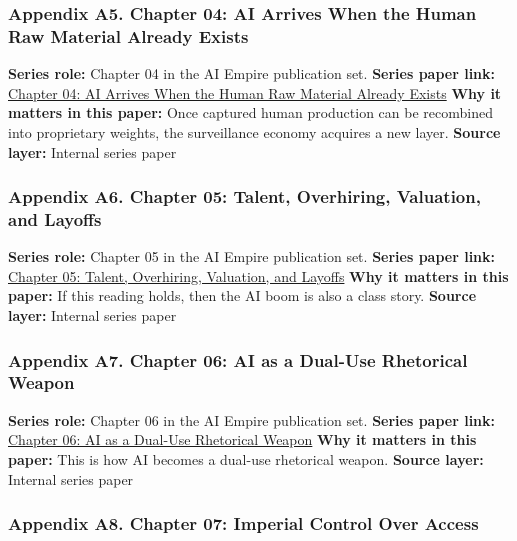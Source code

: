 \documentclass[
  american,
  11pt,
  letterpaper,
]{article}
\begin{document}
\subsubsection{Appendix A5. Chapter 04: AI Arrives When the Human Raw
Material Already
Exists}\label{appendix-a5-chapter-04-ai-arrives-when-the-human-raw-material-already-exists}

\textbf{Series role:} Chapter 04 in the AI Empire publication set.
\textbf{Series paper link:}
\href{04_data-models-weights_paper.html}{Chapter 04: AI Arrives When the
Human Raw Material Already Exists} \textbf{Why it matters in this
paper:} Once captured human production can be recombined into
proprietary weights, the surveillance economy acquires a new layer.
\textbf{Source layer:} Internal series paper

\subsubsection{Appendix A6. Chapter 05: Talent, Overhiring, Valuation,
and
Layoffs}\label{appendix-a6-chapter-05-talent-overhiring-valuation-and-layoffs}

\textbf{Series role:} Chapter 05 in the AI Empire publication set.
\textbf{Series paper link:}
\href{05_talent-overhiring-layoffs_paper.html}{Chapter 05: Talent,
Overhiring, Valuation, and Layoffs} \textbf{Why it matters in this
paper:} If this reading holds, then the AI boom is also a class story.
\textbf{Source layer:} Internal series paper

\subsubsection{Appendix A7. Chapter 06: AI as a Dual-Use Rhetorical
Weapon}\label{appendix-a7-chapter-06-ai-as-a-dual-use-rhetorical-weapon}

\textbf{Series role:} Chapter 06 in the AI Empire publication set.
\textbf{Series paper link:}
\href{06_dual-use-rhetorical-weapon_paper.html}{Chapter 06: AI as a
Dual-Use Rhetorical Weapon} \textbf{Why it matters in this paper:} This
is how AI becomes a dual-use rhetorical weapon. \textbf{Source layer:}
Internal series paper

\subsubsection{Appendix A8. Chapter 07: Imperial Control Over
Access}\label{appendix-a8-chapter-07-imperial-control-over-access}
\end{document}
